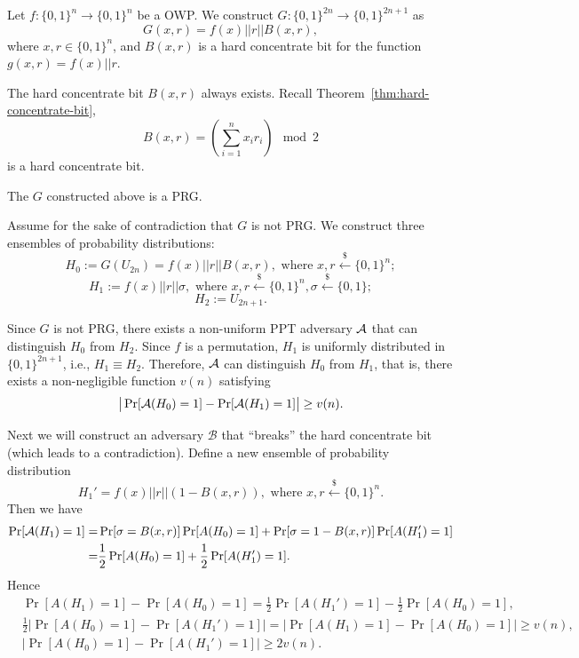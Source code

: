 \documentclass[12pt]{tufte-book}
\begin{document}
\begin{construction}
Let $f: \{0, 1\}^n \rightarrow \{0, 1\}^n$ be a OWP. We construct $G: \{0, 1\}^{2n} \rightarrow \{0, 1\}^{2n+1}$ as
\[
G(x, r) = f(x) || r || B(x, r),
\]
where $x, r \in \{0, 1\}^n$, and $B(x, r)$ is a hard concentrate bit for the function $g(x,r) = f(x) || r$.
\end{construction}

\begin{remark}
The hard concentrate bit $B(x,r)$ always exists. Recall Theorem~\ref{thm:hard-concentrate-bit},
\[B(x,r) = \left(\sum_{i=1}^n x_i r_i\right)\mod 2\]
is a hard concentrate bit.
\end{remark}

\begin{theorem}
The $G$ constructed above is a PRG.
\end{theorem}

\proof
Assume for the sake of contradiction that $G$ is not PRG.
We construct three ensembles of probability distributions:
\[H_0 := G(U_{2n}) = f(x) || r || B(x, r), \text{ where } x, r \xleftarrow{\$} \{0, 1\}^n;\]
\[H_1 := f(x) || r || \sigma, \text{ where } x, r \xleftarrow{\$} \{0, 1\}^n, \sigma \xleftarrow{\$} \{0, 1\};\]
\[H_2 := U_{2n+1}.\]

Since $G$ is not PRG, there exists a non-uniform PPT adversary $\mathcal{A}$ that can distinguish $H_0$ from $H_2$.
Since $f$ is a permutation, $H_1$ is uniformly distributed in $\{0, 1\}^{2n+1}$, i.e., $H_1 \equiv H_2$.
Therefore, $\mathcal{A}$ can distinguish $H_0$ from $H_1$,
that is, there exists a non-negligible function $v(n)$ satisfying
\[
\big| \Pr[\mathcal{A}(H_0)=1] - \Pr[\mathcal{A}(H_1)=1] \big| \geq v(n).
\]

Next we will construct an adversary $\mathcal{B}$ that ``breaks'' the hard concentrate bit (which leads to a contradiction).
Define a new ensemble of probability distribution
\[
H_1' = f(x) || r || (1-B(x, r)) , \text{ where } x, r \xleftarrow{\$} \{0, 1\}^n.
\]
Then we have
\begin{align*}
\Pr[\mathcal{A}(H_1) = 1]
=& \Pr[\sigma = B(x, r)] \Pr[A(H_0) = 1] + \Pr[\sigma = 1 - B(x, r)] \Pr[A(H_1') = 1]\\
=& \frac{1}{2} \Pr[A(H_0) = 1] + \frac{1}{2}\Pr[A(H_1') = 1].
\end{align*}
Hence
\begin{align*}
&\Pr[A(H_1) = 1] - \Pr[A(H_0) = 1]
=  \frac{1}{2}\Pr[A(H_1') = 1] - \frac{1}{2} \Pr[A(H_0) = 1],
\\
&\frac{1}{2} \left|\Pr[A(H_0) = 1] - \Pr[A(H_1') = 1] \right|
= \left| \Pr[A(H_1) = 1] - \Pr[A(H_0) = 1] \right|
\geq v(n),
\\
&\left|\Pr[A(H_0) = 1] - \Pr[A(H_1') = 1] \right|
\geq 2v(n).
\end{align*}
\end{document}
